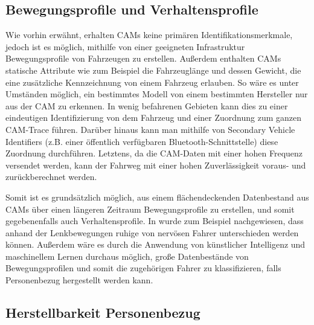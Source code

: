 \subsection{Bewegungsprofile und Verhaltensprofile}
\label{sec:SecondContentSection:SecondSubsection:FirstSubSubsection}

Wie vorhin erwähnt, erhalten CAMs keine primären Identifikationsmerkmale, jedoch ist es möglich, mithilfe von einer geeigneten Infrastruktur Bewegungsprofile von Fahrzeugen zu erstellen. Außerdem enthalten CAMs statische Attribute wie zum Beispiel die Fahrzeuglänge und dessen Gewicht, die eine zusätzliche Kennzeichnung von einem Fahrzeug erlauben. So wäre es unter Umständen möglich, ein bestimmtes Modell von einem bestimmten Hersteller nur aus der CAM zu erkennen. In wenig befahrenen Gebieten kann dies zu einer eindeutigen Identifizierung von dem Fahrzeug und einer Zuordnung zum ganzen CAM-Trace führen. Darüber hinaus kann man mithilfe von Secondary Vehicle Identifiers (z.B. einer öffentlich verfügbaren Bluetooth-Schnittstelle) diese Zuordnung durchführen. Letztens, da die CAM-Daten mit einer hohen Frequenz versendet werden, kann der Fahrweg mit einer hohen Zuverlässigkeit voraus- und zurückberechnet werden. 

Somit ist es grundsätzlich möglich, aus einem flächendeckenden Datenbestand aus CAMs über einen längeren Zeitraum Bewegungsprofile zu erstellen, und somit gegebenenfalls auch Verhaltensprofile. In \cite{Dettki2005} wurde zum Beispiel nachgewiesen, dass anhand der Lenkbewegungen ruhige von nervösen Fahrer unterschieden werden können. Außerdem wäre es durch die Anwendung von künstlicher Intelligenz und maschinellem Lernen durchaus möglich, große Datenbestände von Bewegungsprofilen und somit die zugehörigen Fahrer zu klassifizieren, falls Personenbezug hergestellt werden kann. 


\subsection{Herstellbarkeit Personenbezug}
\label{sec:SecondContentSection:SecondSubsection:SecondSubSubsection}


